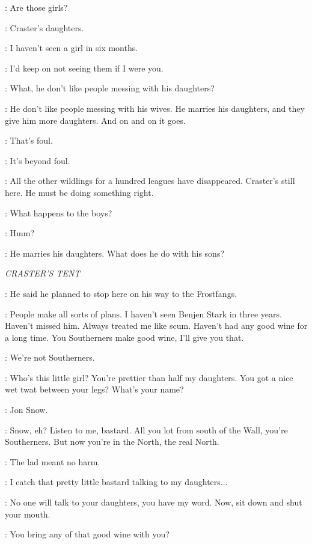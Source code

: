 \SAM: Are those girls?

\EDD: Craster's daughters.

\SAM: I haven't seen a girl in six months.

\EDD: I'd keep on not seeing them if I were you.

\GRENN: What, he don't like people messing with his daughters?

\EDD: He don't like people messing with his wives. He marries his daughters, and they give him more daughters. And on and on it goes.

\SAM: That's foul.

\GRENN: It's beyond foul.

\EDD: All the other wildlings for a hundred leagues have disappeared. Craster's still here. He must be doing something right.

\JON: What happens to the boys?

\EDD: Hmm?

\JON: He marries his daughters. What does he do with his sons?


\scene

\textit{CRASTER'S TENT}


\JEOR: He said he planned to stop here on his way to the Frostfangs.

\CRASTER: People make all sorts of plans. I haven't seen Benjen Stark in three years. Haven't missed him. Always treated me like scum. Haven't had any good wine for a long time. You Southerners make good wine, I'll give you that.

\JON: We're not Southerners.

\CRASTER: Who's this little girl? You're prettier than half my daughters. You got a nice wet twat between your legs? What's your name?

\JON: Jon Snow.

\CRASTER: Snow, eh? Listen to me, bastard. All you lot from south of the Wall, you're Southerners. But now you're in the North, the real North.

\JEOR: The lad meant no harm.

\CRASTER: I catch that pretty little bastard talking to my daughters$\ldots$

\JEOR: No one will talk to your daughters, you have my word.  Now, sit down and shut your mouth.

\CRASTER: You bring any of that good wine with you?

